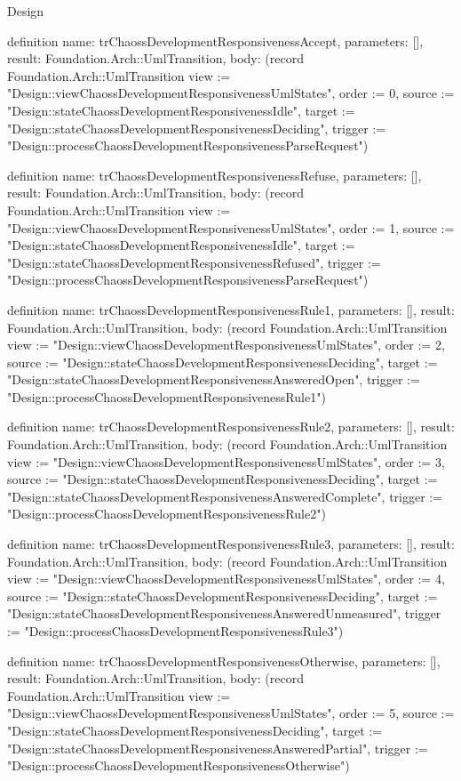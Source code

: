 \begin{lexlean}{Design}
\begin{semanticmodule}
definition{
  name: trChaossDevelopmentResponsivenessAccept,
  parameters: [],
  result: Foundation.Arch::UmlTransition,
  body: (record Foundation.Arch::UmlTransition {view := "Design::viewChaossDevelopmentResponsivenessUmlStates", order := 0, source := "Design::stateChaossDevelopmentResponsivenessIdle", target := "Design::stateChaossDevelopmentResponsivenessDeciding", trigger := "Design::processChaossDevelopmentResponsivenessParseRequest"})
}

definition{
  name: trChaossDevelopmentResponsivenessRefuse,
  parameters: [],
  result: Foundation.Arch::UmlTransition,
  body: (record Foundation.Arch::UmlTransition {view := "Design::viewChaossDevelopmentResponsivenessUmlStates", order := 1, source := "Design::stateChaossDevelopmentResponsivenessIdle", target := "Design::stateChaossDevelopmentResponsivenessRefused", trigger := "Design::processChaossDevelopmentResponsivenessParseRequest"})
}

definition{
  name: trChaossDevelopmentResponsivenessRule1,
  parameters: [],
  result: Foundation.Arch::UmlTransition,
  body: (record Foundation.Arch::UmlTransition {view := "Design::viewChaossDevelopmentResponsivenessUmlStates", order := 2, source := "Design::stateChaossDevelopmentResponsivenessDeciding", target := "Design::stateChaossDevelopmentResponsivenessAnsweredOpen", trigger := "Design::processChaossDevelopmentResponsivenessRule1"})
}

definition{
  name: trChaossDevelopmentResponsivenessRule2,
  parameters: [],
  result: Foundation.Arch::UmlTransition,
  body: (record Foundation.Arch::UmlTransition {view := "Design::viewChaossDevelopmentResponsivenessUmlStates", order := 3, source := "Design::stateChaossDevelopmentResponsivenessDeciding", target := "Design::stateChaossDevelopmentResponsivenessAnsweredComplete", trigger := "Design::processChaossDevelopmentResponsivenessRule2"})
}

definition{
  name: trChaossDevelopmentResponsivenessRule3,
  parameters: [],
  result: Foundation.Arch::UmlTransition,
  body: (record Foundation.Arch::UmlTransition {view := "Design::viewChaossDevelopmentResponsivenessUmlStates", order := 4, source := "Design::stateChaossDevelopmentResponsivenessDeciding", target := "Design::stateChaossDevelopmentResponsivenessAnsweredUnmeasured", trigger := "Design::processChaossDevelopmentResponsivenessRule3"})
}

definition{
  name: trChaossDevelopmentResponsivenessOtherwise,
  parameters: [],
  result: Foundation.Arch::UmlTransition,
  body: (record Foundation.Arch::UmlTransition {view := "Design::viewChaossDevelopmentResponsivenessUmlStates", order := 5, source := "Design::stateChaossDevelopmentResponsivenessDeciding", target := "Design::stateChaossDevelopmentResponsivenessAnsweredPartial", trigger := "Design::processChaossDevelopmentResponsivenessOtherwise"})
}


\end{semanticmodule}
\end{lexlean}
